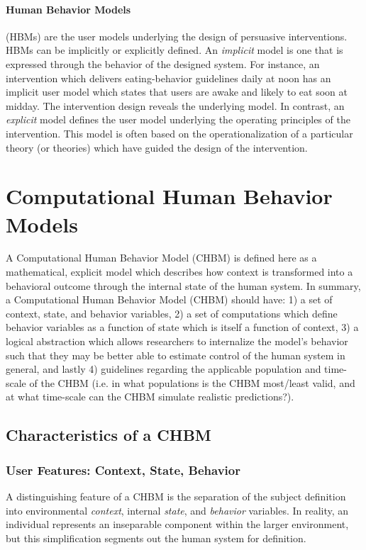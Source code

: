 \documentclass[runningheads,a4paper]{llncs}
\begin{document}
\paragraph{Human Behavior Models} (HBMs) are the user models underlying the design of persuasive interventions.
HBMs can be implicitly or explicitly defined.
An \emph{implicit} model is one that is expressed through the behavior of the designed system. 
For instance, an intervention which delivers eating-behavior guidelines daily at noon has an implicit user model which states that users are awake and likely to eat soon at midday.
The intervention design reveals the underlying model.
In contrast, an \emph{explicit} model  defines the user model underlying the operating principles of the intervention. This model is often based on the operationalization of a particular theory (or theories) which have guided the design of the intervention.

\section{Computational Human Behavior Models}
A Computational Human Behavior Model (CHBM) is defined here as a mathematical, explicit model which describes how context is transformed into a behavioral outcome through the internal state of the human system.
In summary, a Computational Human Behavior Model (CHBM) should have: 1) a set of context, state, and behavior variables, 2) a set of computations which define behavior variables as a function of state which is itself a function of context, 3) a logical abstraction which allows researchers to internalize the model’s behavior such that they may be better able to estimate control of the human system in general, and lastly 4) guidelines regarding the applicable population and time-scale of the CHBM (i.e. in what populations is the CHBM most/least valid, and at what time-scale can the CHBM simulate realistic predictions?). 

\subsection{Characteristics of a CHBM}
\subsubsection{User Features: Context, State, Behavior}
A distinguishing feature of a CHBM is the separation of the subject definition into environmental \emph{context}, internal \emph{state}, and \emph{behavior} variables.
In reality, an individual represents an inseparable component within the larger environment, but this simplification segments out the human system for definition.
\end{document}
